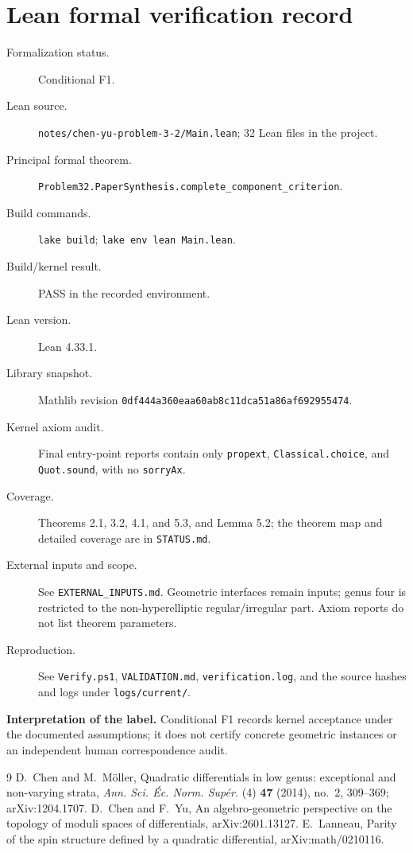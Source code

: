 \documentclass[11pt]{article}
\theoremstyle{remark}
\begin{document}
\section*{Lean formal verification record}
\begingroup\small\sloppy
\begin{description}
\item[Formalization status.] Conditional F1.
\item[Lean source.] \texttt{notes/chen-yu-problem-3-2/Main.lean}; 32 Lean files in the project.
\item[Principal formal theorem.] \texttt{Problem32.PaperSynthesis.complete\_component\_criterion}.
\item[Build commands.] \texttt{lake build}; \texttt{lake env lean Main.lean}.
\item[Build/kernel result.] PASS in the recorded environment.
\item[Lean version.] Lean 4.33.1.
\item[Library snapshot.] Mathlib revision \texttt{0df444a360eaa60ab8c11dca51a86af692955474}.
\item[Kernel axiom audit.] Final entry-point reports contain only \texttt{propext}, \texttt{Classical.choice}, and \texttt{Quot.sound}, with no \texttt{sorryAx}.
\item[Coverage.] Theorems 2.1, 3.2, 4.1, and 5.3, and Lemma 5.2; the theorem map and detailed coverage are in \texttt{STATUS.md}.
\item[External inputs and scope.] See \texttt{EXTERNAL\_INPUTS.md}. Geometric interfaces remain inputs; genus four is restricted to the non-hyperelliptic regular/irregular part. Axiom reports do not list theorem parameters.
\item[Reproduction.] See \texttt{Verify.ps1}, \texttt{VALIDATION.md}, \texttt{verification.log}, and the source hashes and logs under \texttt{logs/current/}.
\end{description}
\noindent\textbf{Interpretation of the label.} Conditional F1 records kernel acceptance under the documented assumptions; it does not certify concrete geometric instances or an independent human correspondence audit.
\endgroup

\begingroup\raggedright
\begin{thebibliography}{9}
D.~Chen and M.~M\"oller,
Quadratic differentials in low genus: exceptional and non-varying strata,
\emph{Ann. Sci. \'Ec. Norm. Sup\'er.} (4) \textbf{47} (2014), no.~2, 309--369;
arXiv:1204.1707.
D.~Chen and F.~Yu,
An algebro-geometric perspective on the topology of moduli spaces of differentials,
arXiv:2601.13127.
E.~Lanneau,
Parity of the spin structure defined by a quadratic differential,
arXiv:math/0210116.
\end{thebibliography}
\endgroup
\end{document}
